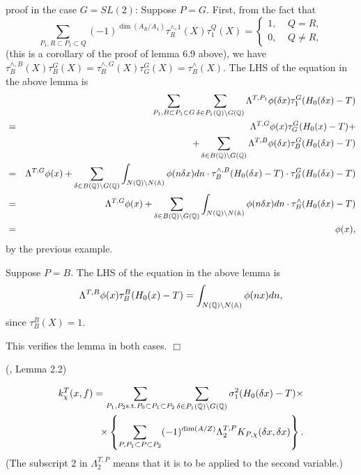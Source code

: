 proof in the case $G=SL(2)$: Suppose $P=G$. First, from the fact that 
\begin{equation}
\sum_{ P_1 , R\subset P_1\subset Q}
 (-1)^{\dim (A_R/A_1)}\tau_R^{\wedge ,1}(X)\tau _1^Q(X)
=\left\{ 
\begin{array}{c}
1,\;\;\;\;Q=R, \\ 
0,\;\;\;\;Q\neq R,
\end{array}
\right.
\end{equation}
(this is a corollary of the proof of lemma 6.9 above), we have $\tau
_B^{\wedge ,B}(X)\tau _B^G(X)=\tau _B^{\wedge ,G}(X)\tau _G^G(X)=\tau
_B^{\wedge }(X)$. The LHS of the equation in the above lemma is 
\begin{eqnarray*}
&&\sum_{ P_1, B\subset P_1\subset G } 
\sum_{\delta \in P_1(\qqq )\backslash G(\qqq )}
\Lambda ^{T,P_1}\phi (\delta x)\tau _1^G(H_0(\delta x)-T) \\
&=&\Lambda ^{T,G}\phi (x)\tau _G^G(H_0(x)-T)+ \\
&&+\sum_{\delta \in B(\qqq )\backslash G(\qqq )}\Lambda ^{T,B}\phi
(\delta x)\tau _B^G(H_0(\delta x)-T) \\
&=&\Lambda ^{T,G}\phi (x)+\sum_{\delta \in B(\qqq )\backslash G(\qqq %
)}\int_{N(\qqq )\backslash N(\aaa )}\phi (n\delta x)dn\cdot \tau
_B^{\wedge ,B}(H_0(\delta x)-T)\cdot \tau _B^G(H_0(\delta x)-T) \\
&=&\Lambda ^{T,G}\phi (x)+\sum_{\delta \in B(\qqq )\backslash G(\qqq %
)}\int_{N(\qqq )\backslash N(\aaa )}\phi (n\delta x)dn\cdot \tau
_B^{\wedge }(H_0(\delta x)-T) \\
&=&\phi (x),
\end{eqnarray*}
by the previous example.

Suppose $P=B$. The LHS of the equation in the above lemma is 
\[
\Lambda ^{T,B}\phi (x)\tau _B^B(H_0(x)-T)
=\int_{N(\mathbb{Q} )\backslash N(\Bbb{A})}\phi (nx)dn, 
\]
since $\tau _B^B(X)=1$.

This verifies the lemma in both cases. $\Box $

\begin{lemma}
(\cite{A3}, Lemma 2.2)

\begin{eqnarray*}
k_\chi ^T(x,f)=\sum_{ P_1,P_2 {\rm s.t.} P_0\subset P_1\subset P_2}
\sum_{\delta \in P_1(\mathbb{Q} )\backslash G(\mathbb{Q} )}
\sigma _1^2(H_0(\delta x)-T)\times  \\
\times \left\{ \sum_{ P, P_1\subset P\subset P_2 }
(-1)^{\dim (A/Z)}\Lambda _2^{T,P}K_{P,\chi }(\delta x,\delta x)\right\} .
\end{eqnarray*}
(The subscript $2$ in $\Lambda _2^{T,P}$ means that it is to be applied to
the second variable.)
\end{lemma}

